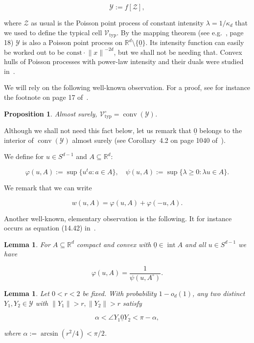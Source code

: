 \documentclass[11pt]{article}%
\newtheorem{lemma} [theorem] {Lemma}%
\newtheorem{proposition} [theorem] {Proposition}%
\newcommand{\Vcal}[0]{\ensuremath{{\mathcal V}}}
\newcommand{\Ycal}[0]{\ensuremath{{\mathcal Y}}}
\newcommand{\Zcal}[0]{\ensuremath{{\mathcal Z}}}
\newcommand{\eR}[0]{\ensuremath{ \mathbb R}}
\newcommand{\norm}[1]{\ensuremath{\|#1\|}}
\newcommand{\orig}{\underline{0}}
\DeclareMathOperator{\conv}{conv}
\DeclareMathOperator{\inter}{int}
\newcommand{\Vtyp}[0]{\Vcal_{\text{typ}}}
\begin{document}
$$ \Ycal := f[\Zcal], $$

\noindent
where $\Zcal$ as usual is the Poisson point process of constant intensity $\lambda=1/\kappa_d$ that we
used to define the typical cell $\Vtyp$.
By the mapping theorem (see e.g.~\cite{Kingman}, page 18) $\Ycal$ is also a Poisson point 
process on $\eR^d\setminus\{\orig\}$. 
Its intensity 
function can easily be worked out to be $\text{const} \cdot \norm{x}^{-2d}$, but we shall not be needing that.
Convex hulls of Poisson processes with power-law intensity and their duals were studied 
in~\cite{ZakharAdvMath, ZakharPAMS, KMTT, KTZ}.

We will rely on the following well-known observation.
For a proof,  see for instance the footnote on page 17 of~\cite{ZakharAdvMath}.

\begin{proposition}
Almost surely, $\Vtyp^{\circ} = \conv(\Ycal)$.
\end{proposition}

\noindent
Although we shall not need this fact below, let us remark that $\orig$ belongs to the interior 
of $\conv (\mathcal Y)$ almost surely (see Corollary~4.2 on page 1040 of~\cite{KMTT}).


We define for $u \in S^{d-1}$ and $A \subseteq  \eR^d$:

$$ \varphi(u,A) := \sup\{ u^t a : a \in A \}, 
\quad \psi(u,A) := \sup\{ \lambda \geq 0 : \lambda u \in A \}. $$

\noindent
We remark that we can write 

$$ w(u,A) = \varphi(u,A) + \varphi(-u,A). $$

Another well-known, elementary observation is the following.
It for instance occurs as equation (14.42) in~\cite{SchneiderWeil}.

\begin{lemma}\label{lem:phipsi}
For $A \subseteq \eR^d$ compact and convex with $\orig \in \inter A$ and 
 all $u \in S^{d-1}$ we have 

$$ \varphi(u,A) = \frac{1}{\psi(u,A^\circ)}. $$

\end{lemma}



\begin{lemma}\label{lem:angleswhp}
Let $0<r<2$ be fixed. 
With probability $1-o_d(1)$, any two distinct $Y_1, Y_2 \in \Ycal$ with $\norm{Y_1}>r,\norm{Y_2} > r$
satisfy 

$$\alpha < \angle Y_1{\orig}Y_2 < \pi-\alpha,$$

\noindent
where $\alpha := \arcsin\left(r^2/4\right) < \pi/2$.
\end{lemma}
\end{document}
